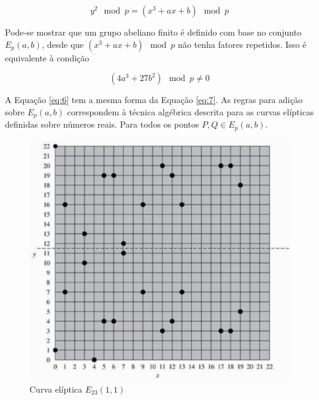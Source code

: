 \begin{equation}
y^2 \mod p = (x^3 + ax + b) \mod p \label{eq:7}
\end{equation}

Pode-se mostrar que um grupo abeliano finito é definido com base no conjunto $E_p(a, b)$, desde que $(x^3 + ax + b) \mod p$ não tenha fatores repetidos. Isso é equivalente à condição

\begin{equation}
(4a^3 + 27b^2) \mod p \neq 0
\end{equation}

A Equação \ref{eq:6} tem a mesma forma da Equação \ref{eq:7}. As regras para adição sobre $E_p(a, b)$ correspondem à técnica algébrica descrita para as curvas elípticas definidas sobre números reais. Para todos os pontos $P, Q \in E_p(a, b)$.

\begin{figure}[h]
\centering
\includegraphics[scale=0.6, bb=0 0 515 478]{figuras/curva_sobre_corpo_finito.eps}
\caption{Curva elíptica $E_{23}(1, 1)$}
\label{fig:curvas}
\end{figure}

